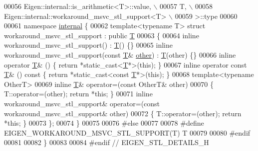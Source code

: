 \begin{DoxyCode}
00056 \textcolor{preprocessor}{    Eigen::internal::is\_arithmetic<T>::value, \(\backslash\)}
00057 \textcolor{preprocessor}{    T, \(\backslash\)}
00058 \textcolor{preprocessor}{    Eigen::internal::workaround\_msvc\_stl\_support<T> \(\backslash\)}
00059 \textcolor{preprocessor}{  >::type}
00060 
00061   \textcolor{keyword}{namespace }\hyperlink{namespaceinternal}{internal} \{
00062   \textcolor{keyword}{template}<\textcolor{keyword}{typename} T> \textcolor{keyword}{struct }workaround\_msvc\_stl\_support : \textcolor{keyword}{public} \hyperlink{group___sparse_core___module}{T}
00063   \{
00064     \textcolor{keyword}{inline} workaround\_msvc\_stl\_support() : \hyperlink{group___sparse_core___module}{T}() \{\}
00065     \textcolor{keyword}{inline} workaround\_msvc\_stl\_support(\textcolor{keyword}{const} \hyperlink{group___sparse_core___module}{T}& \hyperlink{class_eigen_1_1aligned__allocator__indirection}{other}) : \hyperlink{group___sparse_core___module}{T}(other) \{\}
00066     \textcolor{keyword}{inline} \textcolor{keyword}{operator} \hyperlink{group___sparse_core___module}{T}& () \{ \textcolor{keywordflow}{return} *\textcolor{keyword}{static\_cast<}\hyperlink{group___sparse_core___module}{T}*\textcolor{keyword}{>}(\textcolor{keyword}{this}); \}
00067     \textcolor{keyword}{inline} \textcolor{keyword}{operator} \textcolor{keyword}{const} \hyperlink{group___sparse_core___module}{T}& () \textcolor{keyword}{const} \{ \textcolor{keywordflow}{return} *\textcolor{keyword}{static\_cast<}\textcolor{keyword}{const }\hyperlink{group___sparse_core___module}{T}*\textcolor{keyword}{>}(\textcolor{keyword}{this}); \}
00068     \textcolor{keyword}{template}<\textcolor{keyword}{typename} OtherT>
00069     \textcolor{keyword}{inline} \hyperlink{group___sparse_core___module}{T}& operator=(\textcolor{keyword}{const} OtherT& other)
00070     \{ T::operator=(other); \textcolor{keywordflow}{return} *\textcolor{keyword}{this}; \}
00071     \textcolor{keyword}{inline} workaround\_msvc\_stl\_support& operator=(\textcolor{keyword}{const} workaround\_msvc\_stl\_support& other)
00072     \{ T::operator=(other); \textcolor{keywordflow}{return} *\textcolor{keyword}{this}; \}
00073   \};
00074   \}
00075 
00076 \textcolor{preprocessor}{#else}
00077 
00078 \textcolor{preprocessor}{#define EIGEN\_WORKAROUND\_MSVC\_STL\_SUPPORT(T) T}
00079 
00080 \textcolor{preprocessor}{#endif}
00081 
00082 \}
00083 
00084 \textcolor{preprocessor}{#endif // EIGEN\_STL\_DETAILS\_H}
\end{DoxyCode}

